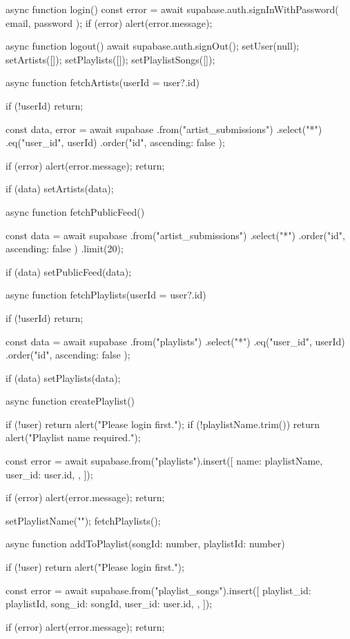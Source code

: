 {  async function login() {
    const { error } = await supabase.auth.signInWithPassword({ email, password });
    if (error) alert(error.message);
  }

  async function logout() {
    await supabase.auth.signOut();
    setUser(null);
    setArtists([]);
    setPlaylists([]);
    setPlaylistSongs([]);
  }

  async function fetchArtists(userId = user?.id) {
    if (!userId) return;

    const { data, error } = await supabase
      .from("artist_submissions")
      .select("*")
      .eq("user_id", userId)
      .order("id", { ascending: false });

    if (error) {
      alert(error.message);
      return;
    }

    if (data) setArtists(data);
  }

  async function fetchPublicFeed() {
    const { data } = await supabase
      .from("artist_submissions")
      .select("*")
      .order("id", { ascending: false })
      .limit(20);

    if (data) setPublicFeed(data);
  }

  async function fetchPlaylists(userId = user?.id) {
    if (!userId) return;

    const { data } = await supabase
      .from("playlists")
      .select("*")
      .eq("user_id", userId)
      .order("id", { ascending: false });

    if (data) setPlaylists(data);
  }

  async function createPlaylist() {
    if (!user) return alert("Please login first.");
    if (!playlistName.trim()) return alert("Playlist name required.");

    const { error } = await supabase.from("playlists").insert([
      {
        name: playlistName,
        user_id: user.id,
      },
    ]);

    if (error) {
      alert(error.message);
      return;
    }

    setPlaylistName("");
    fetchPlaylists();
  }

  async function addToPlaylist(songId: number, playlistId: number) {
    if (!user) return alert("Please login first.");

    const { error } = await supabase.from("playlist_songs").insert([
      {
        playlist_id: playlistId,
        song_id: songId,
        user_id: user.id,
      },
    ]);

    if (error) {
      alert(error.message);
      return;
    }

}}
